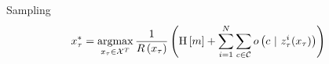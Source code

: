 %
Sampling
\begin{align}
  \begin{split}
    x_{\tau}^{*}
    &=
    \argmax_{x_{\tau} \in \mc{X}^{T}}
    \frac{1}{R\left(x_{\tau}\right)}
    \left(
      \text{H}
      \left[
        m
      \right]
      +
      \sum_{i=1}^{N}
      \sum_{c \in \mc{C}}
      o
      \left(
      c
      \ \vert
      \ z_{\tau}^{i}(x_{\tau})
      \right)
      \right)
  \end{split}
\end{align}
%

